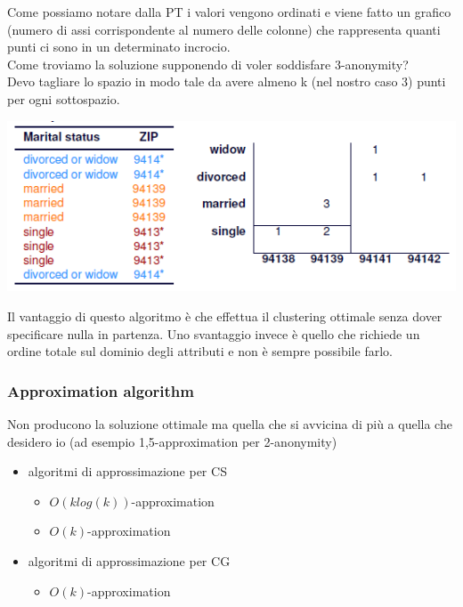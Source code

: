 Come possiamo notare dalla PT i valori vengono ordinati e viene fatto un grafico (numero di assi corrispondente al numero delle colonne) che rappresenta quanti punti ci sono in un determinato incrocio.\\
Come troviamo la soluzione supponendo di voler soddisfare 3-anonymity?\\
Devo tagliare lo spazio in modo tale da avere almeno k (nel nostro caso 3) punti per ogni sottospazio. 
\begin{center}
    \includegraphics[scale=0.6]{img/modrian2.png}
\end{center}
Il vantaggio di questo algoritmo è che effettua il clustering ottimale senza dover specificare nulla in partenza. Uno svantaggio invece è quello che richiede un ordine totale sul dominio degli attributi e non è sempre possibile farlo.

\subsubsection{Approximation algorithm}
Non producono la soluzione ottimale ma quella che si avvicina di più a quella che desidero io (ad esempio 1,5-approximation per 2-anonymity)
\begin{itemize}
    \item algoritmi di approssimazione per CS
    \begin{itemize}
        \item \(O(klog(k))\)-approximation
        \item \(O(k)\)-approximation
    \end{itemize}
    \item algoritmi di approssimazione per CG
    \begin{itemize}
        \item \(O(k)\)-approximation
    \end{itemize}
\end{itemize}

